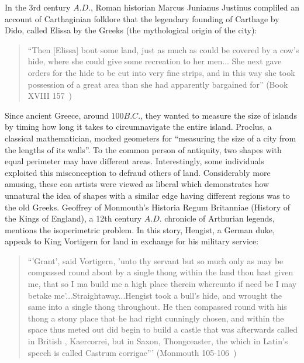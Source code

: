 \documentclass[a4paper]{book}
\numberwithin{theorem}{section}%
\begin{document}
In the 3rd century $A.D.$, Roman historian Marcus Junianus Justinus compliled an account of Carthaginian folklore that the legendary founding of Carthage by Dido, called Elissa by the Greeks (the mythological origin of the city):
\begin{center}
    \begin{quote}
        ``Then [Elissa] bout some land, just as much as could be covered by a cow's hide, where she could give some recreation to her men... She next gave orders for the hide to be cut into very fine strips, and in this way she took possession of a great area than she had apparently bargained for'' (Book XVIII 157~\citep{yardley1994justin})
    \end{quote}
\end{center}

Since ancient Greece, around $100B.C.$, they wanted to measure the size of islands by timing how long it takes to circumnavigate the entire island. Proclus, a classical mathematician, mocked geometers for ``measuring the size of a city from the lengths of its walls''. To the common person of antiquity, two shapes with equal perimeter may have different areas. Interestingly, some individuals exploited this misconception to defraud others of land. Considerably more amusing, these con artists were viewed as liberal which demonstrates how unnatural the idea of shapes with a similar edge having different regions was to the old Greeks.
\newline
\newline
Geoffrey of Monmouth's Historia Regum Britanniae (History of the Kings of England), a 12th century $A.D.$ chronicle of Arthurian legends, mentions the isoperimetric problem. In this story, Hengist, a German duke, appeals to King Vortigern for land in exchange for his military service:
\begin{center}
    \begin{quote}
        ``'Grant', said Vortigern, 'unto thy servant but so much only as may be compassed round about by a single thong within the land thou hast given me, that so I ma build me a high place therein whereunto if need be I may betake me’...Straightaway...Hengist took a bull’s hide, and wrought the same into a single thong throughout. He then compassed round with his thong a stony place that he had right cunningly chosen, and within the space thus meted out did begin to build a castle that was afterwards called in British , Kaercorrei, but in Saxon, Thongceaster, the which in Latin’s speech is called Castrum corrigae''' (Monmouth 105-106~\citep{evans1920histories})
    \end{quote}
\end{center}
\end{document}
